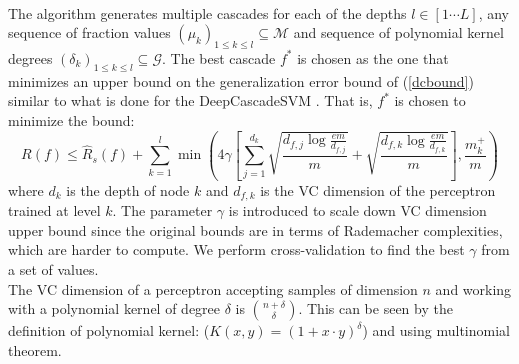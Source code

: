 \documentclass[paper=letter, fontsize=11pt]{scrartcl}
\numberwithin{equation}{section}		%
\numberwithin{figure}{section}			%
\numberwithin{table}{section}				%
\begin{document}
\\The algorithm generates multiple cascades for each of the depths $l \in [1 \cdots L]$, any sequence of fraction values $(\mu_k)_{1 \leq k \leq l} \subseteq \mathcal{M}$ and sequence of polynomial kernel degrees $(\delta_k)_{1 \leq k \leq l} \subseteq \mathcal{G}$. The best cascade $f^*$ is chosen as the one that minimizes an upper bound on the generalization error bound of (\ref{dcbound}) similar to what is done for the DeepCascadeSVM \cite{deepcascades}. That is, $f^*$ is chosen to minimize the bound:
\begin{equation}
R(f) \leq \widehat{R}_s(f) + \sum_{k=1}^{l} \min \left( 4\gamma \left[ \sum_{j=1}^{d_k} \sqrt{\frac{d_{f,j} \log\frac{em}{d_{f,j}}}{m}} + \sqrt{\frac{d_{f,k} \log\frac{em}{d_{f,k}}}{m}} \right] , \frac{m_k^+}{m} \right)
\label{dcvcbound}
\end{equation}
where $d_k$ is the depth of node $k$ and $d_{f,k}$ is the VC dimension of the perceptron trained at level $k$. The parameter $\gamma$ is introduced to scale down VC dimension upper bound since the original bounds are in terms of Rademacher complexities, which are harder to compute. We perform cross-validation to find the best $\gamma$ from a set of values. %
\\The VC dimension of a perceptron accepting samples of dimension $n$ and working with a polynomial kernel of degree $\delta$ is $\binom{n+\delta}{\delta}$. This can be seen by the definition of polynomial kernel: ($K(x,y) = (1+x \cdot y)^\delta$) and using multinomial theorem.
\end{document}
